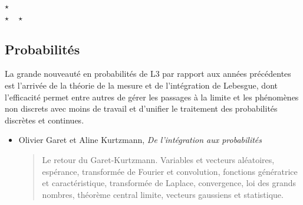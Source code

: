 \documentclass{article}
\def\separateur{\begin{center}
$\star$\\
$\star\quad\star$
\end{center}}
\begin{document}
\separateur
\subsection{Probabilités}

La grande nouveauté en probabilités de L3 par rapport aux années précédentes est l'arrivée de la théorie de la mesure et de l'intégration de Lebesgue, dont l'efficacité permet entre autres de gérer les passages à la limite et les phénomènes non discrets avec moins de travail et d'unifier le traitement des probabilités discrètes et continues.



\begin{mdframed}
\begin{itemize}
\item Olivier Garet et Aline Kurtzmann, \emph{De l'intégration aux probabilités}
\begin{quote}
Le retour du Garet-Kurtzmann. Variables et vecteurs aléatoires, espérance, transformée de Fourier et convolution, fonctions génératrice et caractéristique, transformée de Laplace, convergence, loi des grands nombres, théorème central limite, vecteurs gaussiens et statistique.
\end{quote}
\end{itemize}
\end{mdframed}
\end{document}
